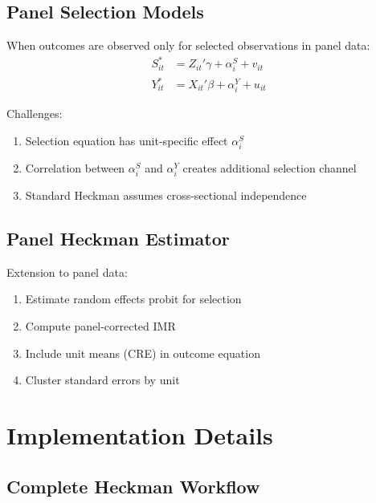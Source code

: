 \subsection{Panel Selection Models}

When outcomes are observed only for selected observations in panel data:
\begin{align}
S_{it}^* &= Z_{it}'\gamma + \alpha_i^S + v_{it} \\
Y_{it}^* &= X_{it}'\beta + \alpha_i^Y + u_{it}
\end{align}

Challenges:
\begin{enumerate}
\item Selection equation has unit-specific effect $\alpha_i^S$
\item Correlation between $\alpha_i^S$ and $\alpha_i^Y$ creates additional selection channel
\item Standard Heckman assumes cross-sectional independence
\end{enumerate}

\subsection{Panel Heckman Estimator}

Extension to panel data:
\begin{enumerate}
\item Estimate random effects probit for selection
\item Compute panel-corrected IMR
\item Include unit means (CRE) in outcome equation
\item Cluster standard errors by unit
\end{enumerate}


\section{Implementation Details}

\subsection{Complete Heckman Workflow}

